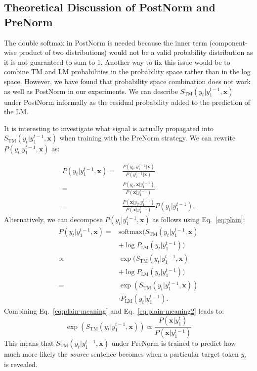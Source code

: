 \documentclass[11pt,a4paper]{article}
\begin{document}
\subsection{Theoretical Discussion of {\sc PostNorm} and {\sc PreNorm}}

The double softmax in {\sc PostNorm} is needed because the inner term (component-wise product of two distributions) would not be a valid probability distribution as it is not guaranteed to sum to 1. Another way to fix this issue would be to combine TM and LM probabilities in the probability space rather than in the log space. However, we have found that probability space combination does not work as well as {\sc PostNorm} in our experiments. We can describe $S_\text{TM}(y_t|y_1^{t-1},\mathbf{x})$ under {\sc PostNorm} informally as the residual probability added to the prediction of the LM.

It is interesting to investigate what signal is actually propagated into $S_\text{TM}(y_t|y_1^{t-1},\mathbf{x})$ when training with the {\sc PreNorm} strategy. We can rewrite $P(y_t|y_1^{t-1},\mathbf{x})$ as:

\begin{equation}
\begin{split}
P(y_t|y_1^{t-1},\mathbf{x}) =& \frac{P(y_t,y_1^{t-1}|\mathbf{x})}{P(y_1^{t-1}|\mathbf{x})} \\
=& \frac{P(y_t,\mathbf{x}|y_1^{t-1})}{P(\mathbf{x}|y_1^{t-1})} \\
=& \frac{P(\mathbf{x}|y_t, y_1^{t-1})}{P(\mathbf{x}|y_1^{t-1})} P(y_t|y_1^{t-1}).
\end{split}
\label{eq:plain-meaning}
\end{equation}
Alternatively, we can decompose $P(y_t|y_1^{t-1},\mathbf{x})$ as follows using Eq.~\ref{eq:plain}:
\begin{equation}
\begin{split}
P(y_t|y_1^{t-1},\mathbf{x}) =& \text{softmax}\Big(S_\text{TM}(y_t|y_1^{t-1},\mathbf{x}) \\
&+ \log P_\text{LM}(y_t|y_1^{t-1}) \Big) \\
\propto & \exp\Big(S_\text{TM}(y_t|y_1^{t-1},\mathbf{x}) \\
&+ \log P_\text{LM}(y_t|y_1^{t-1}) \Big) \\
=& \exp(S_\text{TM}(y_t|y_1^{t-1},\mathbf{x}))\\ 
&\cdot P_\text{LM}(y_t|y_1^{t-1}).
\end{split}
\label{eq:plain-meaning2}
\end{equation}
Combining Eq.~\ref{eq:plain-meaning} and Eq.~\ref{eq:plain-meaning2} leads to:
\begin{equation}
\exp(S_\text{TM}(y_t|y_1^{t-1},\mathbf{x}))\propto\frac{P(\mathbf{x}|y_1^t)}{P(\mathbf{x}|y_1^{t-1})}
\end{equation}
This means that $S_\text{TM}(y_t|y_1^{t-1},\mathbf{x})$ under {\sc PreNorm} is trained to predict how much more likely the {\em source} sentence becomes when a particular target token $y_t$ is revealed.
\end{document}

